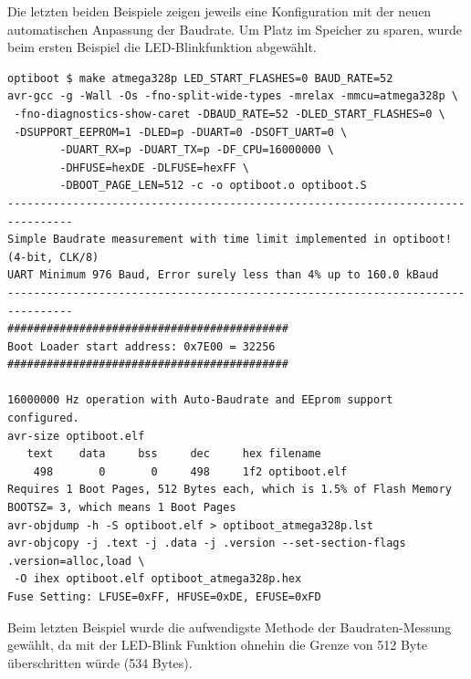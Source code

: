 Die letzten beiden Beispiele zeigen jeweils eine Konfiguration mit der neuen automatischen Anpassung der Baudrate.
Um Platz im Speicher zu sparen, wurde beim ersten Beispiel die LED-Blinkfunktion abgewählt.

\begin{verbatim}
optiboot $ make atmega328p LED_START_FLASHES=0 BAUD_RATE=52
avr-gcc -g -Wall -Os -fno-split-wide-types -mrelax -mmcu=atmega328p \
 -fno-diagnostics-show-caret -DBAUD_RATE=52 -DLED_START_FLASHES=0 \
 -DSUPPORT_EEPROM=1 -DLED=p -DUART=0 -DSOFT_UART=0 \
        -DUART_RX=p -DUART_TX=p -DF_CPU=16000000 \
        -DHFUSE=hexDE -DLFUSE=hexFF \
        -DBOOT_PAGE_LEN=512 -c -o optiboot.o optiboot.S
--------------------------------------------------------------------------------
Simple Baudrate measurement with time limit implemented in optiboot! (4-bit, CLK/8)
UART Minimum 976 Baud, Error surely less than 4% up to 160.0 kBaud
--------------------------------------------------------------------------------
###########################################
Boot Loader start address: 0x7E00 = 32256
###########################################

16000000 Hz operation with Auto-Baudrate and EEprom support configured.
avr-size optiboot.elf
   text	   data	    bss	    dec	    hex	filename
    498	      0	      0	    498	    1f2	optiboot.elf
Requires 1 Boot Pages, 512 Bytes each, which is 1.5% of Flash Memory
BOOTSZ= 3, which means 1 Boot Pages
avr-objdump -h -S optiboot.elf > optiboot_atmega328p.lst
avr-objcopy -j .text -j .data -j .version --set-section-flags .version=alloc,load \
 -O ihex optiboot.elf optiboot_atmega328p.hex
Fuse Setting: LFUSE=0xFF, HFUSE=0xDE, EFUSE=0xFD
\end{verbatim}

Beim letzten Beispiel wurde die aufwendigste Methode der Baudraten-Messung
gewählt, da mit der LED-Blink Funktion ohnehin die Grenze von 512 Byte
überschritten würde (534 Bytes).

